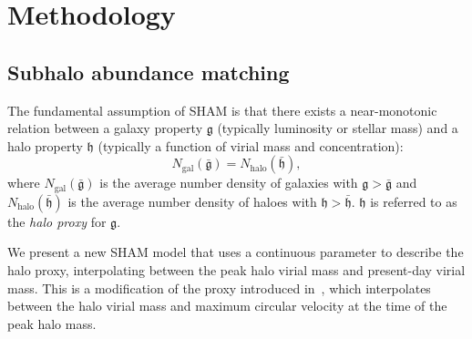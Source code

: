 \documentclass[usenatbib,useAMS]{mnras}
\begin{document}
\section{Methodology}\label{sec:method}

\subsection{Subhalo abundance matching}\label{sec:catalogs}

The fundamental assumption of \ac{SHAM} is that there exists a near-monotonic relation between a galaxy property $\mathfrak{g}$ (typically luminosity or stellar mass) and a halo property $\mathfrak{h}$ (typically a function of virial mass and concentration):
%
\begin{equation}\label{eq:abundance_matching}
    N_{\mathrm{gal}} \left(\bar{\mathfrak{g}}\right)
    =
    N_{\mathrm{halo}} \left(\bar{\mathfrak{h}}\right),
\end{equation}
%
where $N_{\mathrm{gal}} \left(\bar{\mathfrak{g}}\right)$ is the average number density of galaxies with $\mathfrak{g}>\bar{\mathfrak{g}}$ and $N_{\mathrm{halo}} \left(\bar{\mathfrak{h}}\right)$ is the average number density of haloes with $\mathfrak{h}>\bar{\mathfrak{h}}$. $\mathfrak{h}$ is referred to as the \emph{halo proxy} for $\mathfrak{g}$.

We present a new \ac{SHAM} model that uses a continuous parameter to describe the halo proxy, interpolating between the peak halo virial mass and present-day virial mass. This is a modification of the proxy introduced in~\cite{Lehmann}, which interpolates between the halo virial mass and maximum circular velocity at the time of the peak halo mass.
\end{document}
